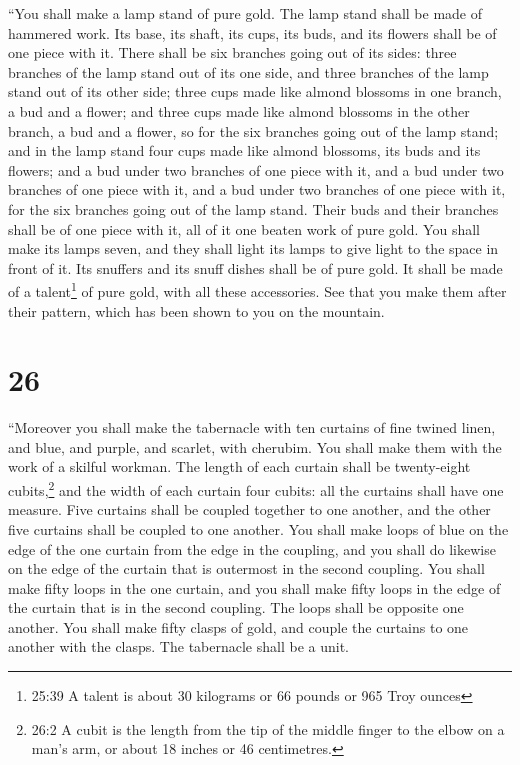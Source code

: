 ``You shall make a lamp stand of pure gold. The lamp stand
shall be made of hammered work. Its base, its shaft, its cups, its buds,
and its flowers shall be of one piece with it.  There shall
be six branches going out of its sides: three branches of the lamp stand
out of its one side, and three branches of the lamp stand out of its
other side;  three cups made like almond blossoms in one
branch, a bud and a flower; and three cups made like almond blossoms in
the other branch, a bud and a flower, so for the six branches going out
of the lamp stand;  and in the lamp stand four cups made
like almond blossoms, its buds and its flowers;  and a bud
under two branches of one piece with it, and a bud under two branches of
one piece with it, and a bud under two branches of one piece with it,
for the six branches going out of the lamp stand.  Their
buds and their branches shall be of one piece with it, all of it one
beaten work of pure gold.  You shall make its lamps seven,
and they shall light its lamps to give light to the space in front of
it.  Its snuffers and its snuff dishes shall be of pure
gold.  It shall be made of a talent\footnote{25:39 A talent
  is about 30 kilograms or 66 pounds or 965 Troy ounces} of pure gold,
with all these accessories.  See that you make them after
their pattern, which has been shown to you on the mountain.

\hypertarget{section-25}{%
\section{26}\label{section-25}}

 ``Moreover you shall make the tabernacle with ten curtains
of fine twined linen, and blue, and purple, and scarlet, with cherubim.
You shall make them with the work of a skilful workman.  The
length of each curtain shall be twenty-eight cubits,\footnote{26:2 A
  cubit is the length from the tip of the middle finger to the elbow on
  a man's arm, or about 18 inches or 46 centimetres.} and the width of
each curtain four cubits: all the curtains shall have one measure.
 Five curtains shall be coupled together to one another, and
the other five curtains shall be coupled to one another. 
You shall make loops of blue on the edge of the one curtain from the
edge in the coupling, and you shall do likewise on the edge of the
curtain that is outermost in the second coupling.  You shall
make fifty loops in the one curtain, and you shall make fifty loops in
the edge of the curtain that is in the second coupling. The loops shall
be opposite one another.  You shall make fifty clasps of
gold, and couple the curtains to one another with the clasps. The
tabernacle shall be a unit.


